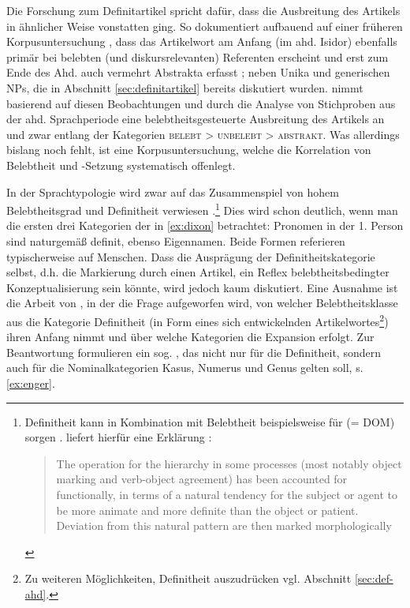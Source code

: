 Die Forschung zum Definitartikel spricht dafür, dass die Ausbreitung des Artikels in ähnlicher Weise vonstatten ging. So dokumentiert \textcite[73ff.]{Oubouzar1992} aufbauend auf einer früheren Korpusuntersuchung \parencite{Oubouzar1989}, dass das  Artikelwort  am Anfang (im ahd. Isidor) ebenfalls primär bei belebten (und diskursrelevanten) Referenten erscheint \parencite[vgl. insbesondere][566-567]{Oubouzar1989} und erst zum Ende des Ahd. auch vermehrt Abstrakta erfasst \parencite[][572]{Oubouzar1989}; neben Unika und generischen NPs, die in Abschnitt \ref{sec:definitartikel} bereits diskutiert wurden. \textcite[74ff.]{Szczepaniak2011} nimmt basierend auf diesen Beobachtungen und durch die Analyse von Stichproben aus der ahd. Sprachperiode eine belebtheitsgesteuerte Ausbreitung des Artikels an und zwar entlang der Kategorien \textsc{belebt > unbelebt > abstrakt}. Was allerdings bislang noch fehlt, ist eine Korpusuntersuchung, welche die Korrelation von Belebtheit und -Setzung systematisch offenlegt. 

In der Sprachtypologie wird zwar auf das Zusammenspiel von hohem Belebtheitsgrad und Definitheit verwiesen \parencites()()[s. z.B.][53]{Dahl1996}[][166f.]{Croft2006}.\footnote{Definitheit kann in Kombination mit Belebtheit beispielsweise für  (= DOM) sorgen \parencite{Aissen2003}. \textcite{Lyons1999} liefert hierfür eine Erklärung \parencite[ähnlich argumentiert auch][119]{Croft1995}: \blockcquote[2014]{Lyons1999}{The operation for the hierarchy in some processes (most notably object marking and verb-object agreement) has been accounted for functionally, in terms of a natural tendency for the subject or agent to be more animate and more definite than the object or patient. Deviation from this natural pattern are then marked morphologically}.}
Dies wird schon deutlich,  wenn man die ersten drei Kategorien der  in \ref{ex:dixon} betrachtet: Pronomen in der 1. Person sind naturgemäß definit, ebenso Eigennamen. Beide Formen referieren typischerweise auf Menschen. Dass die Ausprägung der Definitheitskategorie selbst, d.h. die  Markierung durch einen Artikel, ein Reflex belebtheitsbedingter Konzeptualisierung sein könnte, wird jedoch kaum diskutiert. Eine Ausnahme ist die Arbeit von \textcite{Enger2011}, in der die Frage aufgeworfen wird, von welcher Belebtheitsklasse aus die Kategorie Definitheit (in Form eines sich entwickelnden Artikelwortes\footnote{Zu weiteren Möglichkeiten, Definitheit auszudrücken vgl. Abschnitt \ref{sec:def-ahd}.}) ihren Anfang nimmt und über welche Kategorien die Expansion erfolgt. Zur Beantwortung formulieren \textcite[206]{Enger2011} ein sog. , das nicht nur für die Definitheit, sondern auch für die Nominalkategorien Kasus, Numerus und Genus gelten soll, s. \ref{ex:enger}. 
   
